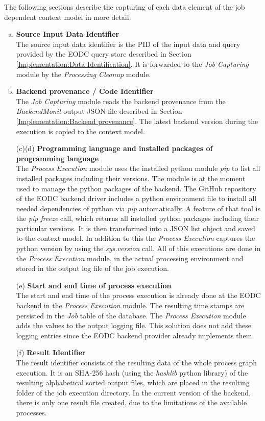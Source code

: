 \documentclass[draft,final]{vutinfth} %
\begin{document}
The following sections describe the capturing of each data element of the job dependent context model in more detail.
\begin{enumerate}[(a)]
\item \textbf{Source Input Data Identifier} \\
	The source input data identifier is the PID of the input data and query provided by the EODC query store described in Section \ref{Implementation:Data Identification}. It is forwarded to the \textit{Job Capturing} module by the \textit{Processing Cleanup} module. 

\item \textbf{Backend provenance / Code Identifier} \\
	The \textit{Job Capturing} module reads the backend provenance from the \textit{BackendMonit} output JSON file described in Section \ref{Implementation:Backend provenance}. The latest backend version during the execution is copied to the context model.

\item[(c)(d)] \textbf{Programming language and  installed packages of programming language} \\
	The \textit{Process Execution} module uses the installed python module \textit{pip} to list all installed packages including their versions. The module is at the moment used to manage the python packages of the backend. The GitHub repository of the EODC backend driver includes a python environment file to install all needed dependencies of python via \textit{pip} automatically. A feature of that tool is the \textit{pip freeze} call, which returns all installed python packages including their particular versions. It is then transformed into a JSON list object and saved to the context model. In addition to this the \textit{Process Execution} captures the python version by using the \textit{sys.version} call. All of this executions are done in the \textit{Process Execution} module, in the actual processing environment and stored in the output log file of the job execution.    

\item[(e)] \textbf{Start and end time of process execution} \\
	The start and end time of the process execution is already done at the EODC backend in the  \textit{Process Execution} module. The resulting time stamps are persisted in the \textit{Job} table of the database. The \textit{Process Execution} module adds the values to the output logging file. This solution does not add these logging entries since the EODC backend provider already implements them.

\item[(f)] \textbf{Result Identifier} \\
	The result identifier consists of the resulting data of the whole process graph execution. It is an SHA-256 hash (using the \textit{hashlib} python library) of the resulting alphabetical sorted output files, which are placed in the resulting folder of the job execution directory. In the current version of the backend, there is only one result file created, due to the limitations of the available processes.   
\end{enumerate}
\end{document}
